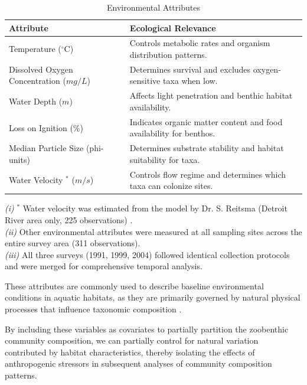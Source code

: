 \begin{table}[htbp]
\centering
\caption{Environmental Attributes}
\label{tab:environmental_attributes}
\begin{tabular}{|>{\centering\arraybackslash}m{4cm}|>{\centering\arraybackslash}m{11cm}|}
\hline
\textbf{Attribute} & \textbf{Ecological Relevance} \\[0.5em]
\hline
Temperature ($^\circ$C) & Controls metabolic rates and organism distribution patterns. \\[0.5em]
\hline
Dissolved Oxygen Concentration ($mg/L$) & Determines survival and excludes oxygen-sensitive taxa when low. \\[0.5em]
\hline
Water Depth ($m$) & Affects light penetration and benthic habitat availability. \\[0.5em]
\hline
Loss on Ignition (\%) & Indicates organic matter content and food availability for benthos. \\[0.5em]
\hline
Median Particle Size (phi-units) & Determines substrate stability and habitat suitability for taxa. \\[0.5em]
\hline
Water Velocity \(^*\) ($m/s$) & Controls flow regime and determines which taxa can colonize sites. \\[0.5em]
\hline
\end{tabular}
\begin{flushleft}
\footnotesize
\textit{(i)} \(^*\) Water velocity was estimated from the model by Dr. S. Reitsma (Detroit River area only, 225 observations) \cite{Zhang2008}.
\\ \textit{(ii)} Other environmental attributes were measured at all sampling sites across the entire survey area (311 observations).
\\ \textit{(iii)} All three surveys (1991, 1999, 2004) followed identical collection protocols and were merged for comprehensive temporal analysis.
\end{flushleft}
\end{table}

These attributes are commonly used to describe baseline environmental conditions in aquatic habitats,
as they are primarily governed by natural physical processes that 
influence taxonomic composition \cite{Davies2006, Turner1989PatternProcess}.

By including these variables as covariates to partially partition the zoobenthic community composition,
we can partially control for natural variation contributed by habitat characteristics, thereby 
isolating the effects of anthropogenic stressors in subsequent analyses 
of community composition patterns.

